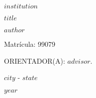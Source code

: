\thispagestyle{empty}

\begin{center}
$institution$
\end{center}


\vspace{4.0cm}

\begin{center}
    \textbf{$title$}
\end{center}

\vspace{4.0cm}

\begin{center}
$author$

Matrícula: 99079
\end{center}


\vspace{4cm}

\begin{center}

ORIENTADOR(A): $advisor$.
\end{center}

\vspace{4cm}

\begin{center}

$city$ - $state$

$year$
    
\end{center}

\newpage
\pagestyle{empty}
\renewcommand{\contentsname}{Sumário}
\tableofcontents
\newpage

\listoffigures

\newpage
